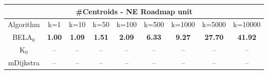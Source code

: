 \begin{tabular}{c|cccccccc}\toprule
\multicolumn{9}{c}{#Centroids - NE Roadmap unit}\\ \midrule
Algorithm & k=1 & k=10 & k=50 & k=100 & k=500 & k=1000 & k=5000 & k=10000 \\ \midrule
BELA$_0$ & \textbf{1.00} & \textbf{1.09} & \textbf{1.51} & \textbf{2.09} & \textbf{6.33} & \textbf{9.27} & \textbf{27.70} & \textbf{41.92} \\
K$_0$ & -- & -- & -- & -- & -- & -- & -- & -- \\
mDijkstra & -- & -- & -- & -- & -- & -- & -- & -- \\ \bottomrule 
\end{tabular}
